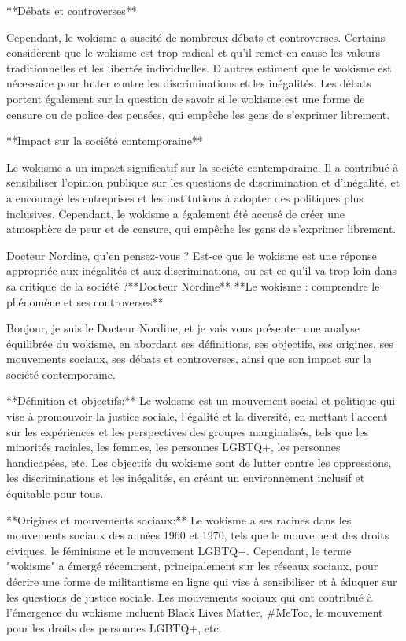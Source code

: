 **Débats et controverses**

Cependant, le wokisme a suscité de nombreux débats et controverses. Certains considèrent que le wokisme est trop radical et qu'il remet en cause les valeurs traditionnelles et les libertés individuelles. D'autres estiment que le wokisme est nécessaire pour lutter contre les discriminations et les inégalités. Les débats portent également sur la question de savoir si le wokisme est une forme de censure ou de police des pensées, qui empêche les gens de s'exprimer librement.

**Impact sur la société contemporaine**

Le wokisme a un impact significatif sur la société contemporaine. Il a contribué à sensibiliser l'opinion publique sur les questions de discrimination et d'inégalité, et a encouragé les entreprises et les institutions à adopter des politiques plus inclusives. Cependant, le wokisme a également été accusé de créer une atmosphère de peur et de censure, qui empêche les gens de s'exprimer librement.

Docteur Nordine, qu'en pensez-vous ? Est-ce que le wokisme est une réponse appropriée aux inégalités et aux discriminations, ou est-ce qu'il va trop loin dans sa critique de la société ?**Docteur Nordine**
**Le wokisme : comprendre le phénomène et ses controverses**

Bonjour, je suis le Docteur Nordine, et je vais vous présenter une analyse équilibrée du wokisme, en abordant ses définitions, ses objectifs, ses origines, ses mouvements sociaux, ses débats et controverses, ainsi que son impact sur la société contemporaine.

**Définition et objectifs:**
Le wokisme est un mouvement social et politique qui vise à promouvoir la justice sociale, l'égalité et la diversité, en mettant l'accent sur les expériences et les perspectives des groupes marginalisés, tels que les minorités raciales, les femmes, les personnes LGBTQ+, les personnes handicapées, etc. Les objectifs du wokisme sont de lutter contre les oppressions, les discriminations et les inégalités, en créant un environnement inclusif et équitable pour tous.

**Origines et mouvements sociaux:**
Le wokisme a ses racines dans les mouvements sociaux des années 1960 et 1970, tels que le mouvement des droits civiques, le féminisme et le mouvement LGBTQ+. Cependant, le terme "wokisme" a émergé récemment, principalement sur les réseaux sociaux, pour décrire une forme de militantisme en ligne qui vise à sensibiliser et à éduquer sur les questions de justice sociale. Les mouvements sociaux qui ont contribué à l'émergence du wokisme incluent Black Lives Matter, #MeToo, le mouvement pour les droits des personnes LGBTQ+, etc.

